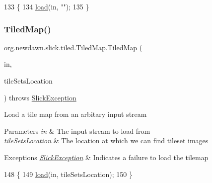 \begin{DoxyCode}
133                                                           \{
134         \mbox{\hyperlink{classorg_1_1newdawn_1_1slick_1_1tiled_1_1_tiled_map_af1c08899abc9e8c33cb08704b764e498}{load}}(in, \textcolor{stringliteral}{""});
135     \}
\end{DoxyCode}
\mbox{\label{classorg_1_1newdawn_1_1slick_1_1tiled_1_1_tiled_map_a105760713bf32625e188dd4e60989aeb}} 
\subsubsection{\texorpdfstring{Tiled\+Map()}{TiledMap()}\hspace{0.1cm}{\footnotesize\ttfamily [5/5]}}
{\footnotesize\ttfamily org.\+newdawn.\+slick.\+tiled.\+Tiled\+Map.\+Tiled\+Map (\begin{DoxyParamCaption}\item[{Input\+Stream}]{in,  }\item[{String}]{tile\+Sets\+Location }\end{DoxyParamCaption}) throws \mbox{\hyperlink{classorg_1_1newdawn_1_1slick_1_1_slick_exception}{Slick\+Exception}}\hspace{0.3cm}{\ttfamily [inline]}}

Load a tile map from an arbitary input stream


\begin{DoxyParams}{Parameters}
{\em in} & The input stream to load from \\
\hline
{\em tile\+Sets\+Location} & The location at which we can find tileset images \\
\hline
\end{DoxyParams}

\begin{DoxyExceptions}{Exceptions}
{\em \mbox{\hyperlink{classorg_1_1newdawn_1_1slick_1_1_slick_exception}{Slick\+Exception}}} & Indicates a failure to load the tilemap \\
\hline
\end{DoxyExceptions}

\begin{DoxyCode}
148                                   \{
149         \mbox{\hyperlink{classorg_1_1newdawn_1_1slick_1_1tiled_1_1_tiled_map_af1c08899abc9e8c33cb08704b764e498}{load}}(in, tileSetsLocation);
150     \}
\end{DoxyCode}


